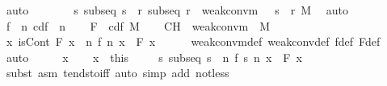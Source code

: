 \documentclass[leqno]{article}
\theoremstyle{definition}
\begin{document}
\begin{isabellebody}
\ auto\isanewline
\ \ \isacommand{{\isacharbraceright}}\isamarkupfalse%
\isanewline
\ \ \isamarkupfalse%
\ {\isacharasterisk}{\isacharcolon}\ {\isachardoublequoteopen}{\isasymAnd}s{\isachardot}\ subseq\ s\ {\isasymLongrightarrow}\ {\isasymexists}r{\isachardot}\ subseq\ r\ {\isasymand}\ weak{\isacharunderscore}conv{\isacharunderscore}m\ {\isacharparenleft}{\isasymmu}\ {\isasymcirc}\ {\isacharparenleft}s\ {\isasymcirc}\ r{\isacharparenright}{\isacharparenright}\ M{\isachardoublequoteclose}\ \isamarkupfalse%
\ auto\isanewline
\ \ \isamarkupfalse%
\ f\ {\isasymequiv}\ {\isachardoublequoteopen}{\isasymlambda}n{\isachardot}\ cdf\ {\isacharparenleft}{\isasymmu}\ n{\isacharparenright}{\isachardoublequoteclose}\isanewline
\ \ \isamarkupfalse%
\ F\ {\isasymequiv}\ {\isachardoublequoteopen}cdf\ M{\isachardoublequoteclose}\isanewline
\ \ \isamarkupfalse%
\ CH{\isacharcolon}\ {\isachardoublequoteopen}{\isasymnot}\ weak{\isacharunderscore}conv{\isacharunderscore}m\ {\isasymmu}\ M{\isachardoublequoteclose}\isanewline
\ \ \isamarkupfalse%
\ {\isachardoublequoteopen}{\isasymexists}x{\isachardot}\ isCont\ F\ x\ {\isasymand}\ {\isasymnot}{\isacharparenleft}{\isacharparenleft}{\isasymlambda}n{\isachardot}\ f\ n\ x{\isacharparenright}\ {\isacharminus}{\isacharminus}{\isacharminus}{\isacharminus}{\isachargreater}\ F\ x{\isacharparenright}{\isachardoublequoteclose}\isanewline
\ \ \ \ \isamarkupfalse%
\ weak{\isacharunderscore}conv{\isacharunderscore}m{\isacharunderscore}def\ weak{\isacharunderscore}conv{\isacharunderscore}def\ f{\isacharunderscore}def\ F{\isacharunderscore}def\ \isamarkupfalse%
\ auto\isanewline
\ \ \isamarkupfalse%
\ \isamarkupfalse%
\ x\ \isacommand{{\isachardot}{\isachardot}}\isamarkupfalse%
\ \isamarkupfalse%
\ x\ {\isacharequal}\ this\isanewline
\ \ \isamarkupfalse%
\ {\isachardoublequoteopen}{\isasymexists}{\isasymepsilon}{\isachargreater}{}{\isachardot}\ {\isasymexists}s{\isachardot}\ subseq\ s\ {\isasymand}\ {\isacharparenleft}{\isasymforall}n{\isachardot}\ {\isasymbar}f\ {\isacharparenleft}s\ n{\isacharparenright}\ x\ {\isacharminus}\ F\ x{\isasymbar}\ {\isasymge}\ {\isasymepsilon}{\isacharparenright}{\isachardoublequoteclose}\isanewline
\ \ \ \ \isamarkupfalse%
\ {\isacharparenleft}subst\ {\isacharparenleft}asm{\isacharparenright}\ tendsto{\isacharunderscore}iff{\isacharcomma}\ auto\ simp\ add{\isacharcolon}\ not{\isacharunderscore}less{\isacharparenright}\isanewline

\end{isabellebody}
\end{document}

